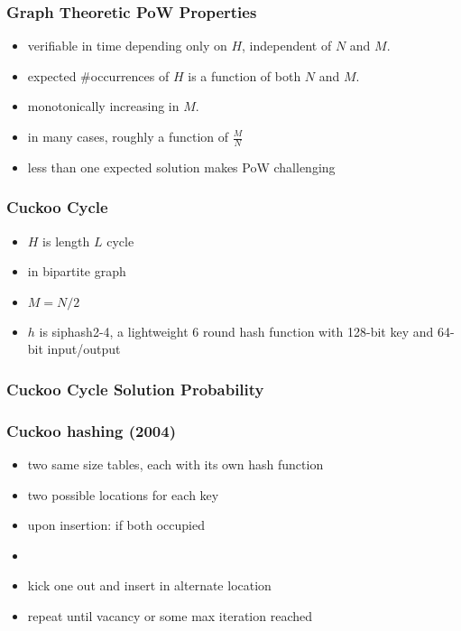 \documentclass{beamer}
\begin{document}
\begin{frame}
\frametitle{Graph Theoretic PoW Properties}
\begin{itemize}
\item verifiable in time depending only on $H$,
independent of $N$ and $M$.
\item expected \#occurrences of $H$ is a function of both $N$ and $M$.
\item monotonically increasing in $M$.
\item in many cases, roughly a function of $\frac{M}{N}$
\item less than one expected solution makes PoW challenging
\end{itemize}
\end{frame}

\begin{frame}
\frametitle{Cuckoo Cycle}
\begin{itemize}
\item $H$ is length $L$ cycle
\item in bipartite graph
\item $M=N/2$
\item $h$ is siphash2-4, a lightweight 6 round hash function
with 128-bit key and 64-bit input/output
\end{itemize}
\end{frame}

\begin{frame}
\frametitle{Cuckoo Cycle Solution Probability}
\end{frame}

\begin{frame}
\frametitle{Cuckoo hashing (2004)}
\begin{itemize}
\item two same size tables, each with its own hash function
\item two possible locations for each key
\item upon insertion: if both occupied
\item
\item kick one out and insert in alternate location
\item repeat until vacancy or some max iteration reached
\end{itemize}
\end{frame}
\end{document}
